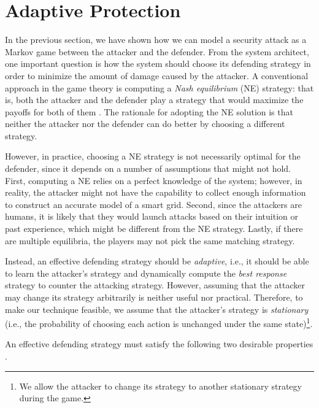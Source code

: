 \section{Adaptive Protection}
\label{amsstrategy}
In the previous section, we have shown how we can model a security attack as a Markov game between the attacker and the defender. From the system architect, one important question is how the system should choose its defending strategy in order to minimize the amount of damage caused by the attacker. A conventional approach in the game theory is computing a \textit{Nash equilibrium} (NE) strategy: that is, both the attacker and the defender play a strategy that would maximize the payoffs for both of them \cite{law2012security, ma2013markov}. The rationale for adopting the NE solution is that neither the attacker nor the defender can do better by choosing a different strategy.

However, in practice, choosing a NE strategy is not necessarily optimal for the defender, since it depends on a number of assumptions that might not hold. First, computing a NE relies on a perfect knowledge of the system; however, in reality, the attacker might not have the capability to collect enough information to construct an accurate model of a smart grid. Second, since the attackers are humans, it is likely that they would launch attacks based on their intuition or past experience, which might be different from the NE strategy. Lastly, if there are multiple equilibria, the players may not pick the same matching strategy.

Instead, an effective defending strategy should be \textit{adaptive}, i.e., it should be able to learn the attacker's strategy and dynamically compute the \textit{best response} strategy to counter the attacking strategy. However, assuming that the attacker may change its strategy arbitrarily is neither useful nor practical. Therefore, to make our technique feasible, we assume that the attacker's strategy is \textit{stationary} (i.e., the probability of choosing each action is unchanged under the same state)\footnote{We allow the attacker to change its strategy to another stationary strategy during the game.}.

An effective defending strategy must satisfy the following two desirable properties \cite{bowling2001convergence}.

